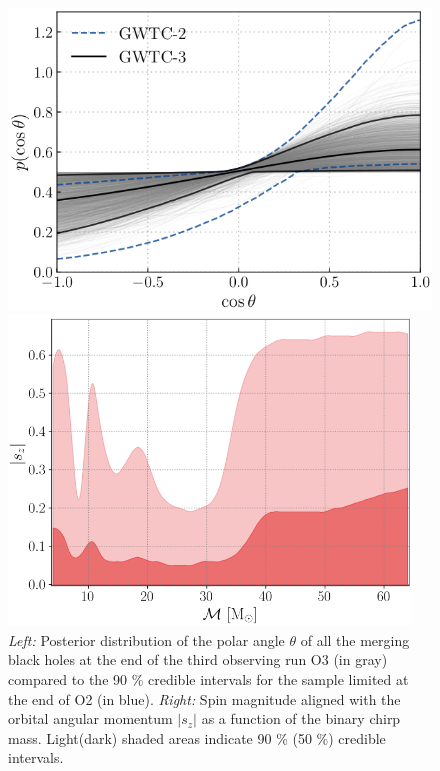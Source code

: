 \documentclass[a4paper,titlepage]{book}     	%
\begin{document}
\begin{figure}
	\begin{minipage}{.49\textwidth}
		\centering
		\includegraphics[width=\textwidth]{./images/spinorientation.png}
	\end{minipage}
	\hfill
	\begin{minipage}{.49\textwidth}
		\centering
		\includegraphics[width=0.95\textwidth]{./images/spinchirpmass.png}	
	\end{minipage}
	\caption{\emph{Left:} Posterior distribution of the polar angle $\theta$ of all the merging black holes at the end of the third observing run O3 (in gray) compared to the 90 \% credible intervals for the sample limited at the end of O2 (in blue). \emph{Right:} Spin magnitude aligned with the orbital angular momentum $|s_z|$ as a function of the binary chirp mass. Light(dark) shaded areas indicate 90 \% (50 \%) credible intervals. \cite{GWTC-3_interpretation}}\label{fig:spinorientation}
\end{figure}
\end{document}
